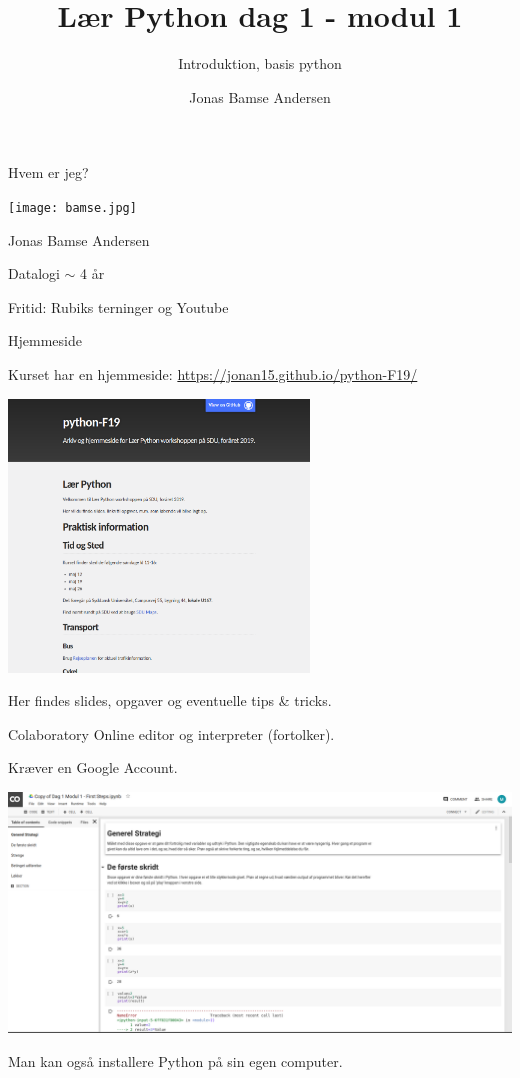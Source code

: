 \documentclass{beamer}
\title{Lær Python dag 1 - modul 1}
\subtitle{Introduktion, basis python}
\date{}
\author[JBA]{Jonas Bamse Andersen}
\institute{Institut for Matematik og Datalogi - IMADA \\
	Syddansk Universitet}
\begin{document}
	
\maketitle
\begin{frame}{Hvem er jeg?}
\begin{center}
\texttt{[image: bamse.jpg]}

Jonas Bamse Andersen

Datalogi $\sim$ 4 år

Fritid: Rubiks terninger og Youtube
\end{center}
\end{frame}

\begin{frame}{Hjemmeside}
\addtocounter{framenumber}{-1}

Kurset har en hjemmeside: \url{https://jonan15.github.io/python-F19/}
\begin{center}
\includegraphics[trim={0 5cm 0 0}, clip, width=0.6\textwidth]{webpage.png}
\end{center}

Her findes slides, opgaver og eventuelle tips \& tricks.	
\end{frame}


\begin{frame}{Colaboratory}
Online editor og interpreter (fortolker).

Kræver en Google Account.

\begin{center}
	\includegraphics[width=\textwidth]{colaboratory.png}
\end{center}

Man kan også installere Python på sin egen computer.
\end{frame}
\end{document}
